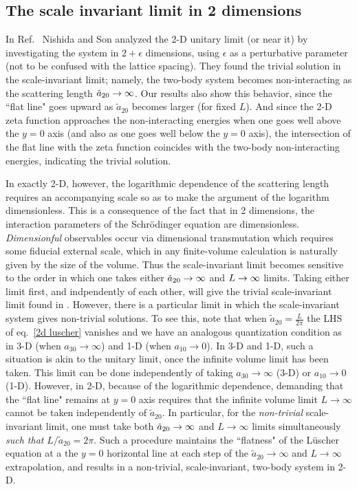 \subsection{The scale invariant limit in 2 dimensions}
In Ref.~\cite{Nishida:2006eu} Nishida and Son analyzed the 2-D unitary limit (or near it) by investigating the system in $2+\epsilon$ dimensions, using $\epsilon$ as a perturbative parameter (not to be confused with the lattice spacing).  They found the trivial solution in the scale-invariant limit; namely, the two-body system becomes non-interacting as the scattering length $\tilde a_{20} \rightarrow\infty$.  Our results also show this behavior, since the ``flat line" goes upward as $\tilde a_{20}$ becomes larger (for fixed $L$).  And since the 2-D zeta function approaches the non-interacting energies when one goes well above the $y=0$ axis (and also as one goes well below the $y=0$ axis), the intersection of the flat line with the zeta function coincides with the two-body non-interacting energies, indicating the trivial solution. 

In exactly 2-D, however, the logarithmic dependence of the scattering length requires an accompanying scale so as to make the argument of the logarithm dimensionless.  This is a consequence of the fact that in 2 dimensions, the interaction parameters of the Schr\"odinger equation are dimensionless.  \emph{Dimensionful} observables occur via dimensional transmutation \cite{} which requires some fiducial external scale, which in any finite-volume calculation is naturally given by the size of the volume.  Thus the scale-invariant limit becomes sensitive to the order in which one takes either $\tilde a_{20}\rightarrow\infty$ and $L\rightarrow\infty$ limits.  Taking either limit first, and indpendently of each other, will give the trivial scale-invariant limit found in \cite{Nishida:2006eu}. %
However, there is a particular limit in which the scale-invariant system gives non-trivial solutions.
To see this, note that when $\tilde a_{20}=\frac{L}{2\pi}$ the LHS of eq.~\eqref{2d luscher} vanishes and we have an analogous quantization condition as in 3-D (when $a_{30}\to\infty$) and 1-D (when $a_{10}\to 0$).  In 3-D and 1-D, such a situation is akin to the unitary limit, once the infinite volume limit has been taken.  This limit can be done independently of taking $a_{30}\to\infty$ (3-D) or $a_{10}\to0$ (1-D).  However, in 2-D, because of the logarithmic dependence, demanding that the ``flat line" remains at $y=0$ axis requires that the infinite volume limit $L\to\infty$ cannot be taken independently of $\tilde a_{20}$.  In particular, for the \emph{non-trivial} scale-invariant limit, one must take both $\tilde a_{20}\rightarrow \infty$ and $L\to\infty$ limits simultaneously \emph{such that} $L/\tilde a_{20}=2\pi$.  Such a procedure maintains the ``flatness" of the L\"uscher equation at a the $y=0$ horizontal line at each step of the $\tilde a_{20}\to\infty$ and $L\to\infty$ extrapolation, and results in a non-trivial, scale-invariant, two-body system in 2-D.  
